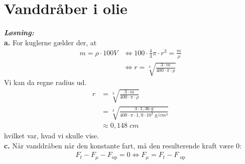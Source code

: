\documentclass{report}
\newcommand{\sol}{\setlength{\parindent}{0cm}\textbf{\textit{Løsning:}}\setlength{\parindent}{1cm}}
\begin{document}
\section*{Vanddråber i olie}
\sol \\
\textbf{a.}
For kuglerne gælder der, at
\begin{equation*}
\begin{split}
  m=\rho \cdot 100 V &\iff 100 \cdot \frac{4}{3} \pi \cdot r^3=\frac{m}{\rho}\\
  &\iff r= \sqrt[3]{\frac{3 \cdot m}{400 \cdot \pi \cdot \rho}} 
\end{split}
\end{equation*}
Vi kan da regne radius ud.
\begin{equation*}
\begin{split}
  r&= \sqrt[3]{\frac{3 \cdot m}{400 \cdot \pi \cdot \rho}} \\
  &= \sqrt[3]{\frac{3 \cdot 1,36 \;\unit{g}  }{400 \cdot \pi \cdot 1,0 \cdot 10^3 \;\unit{g/cm^3}}} \\
  &\approx 0,148 \;\unit{cm} 
\end{split}
\end{equation*}
hvilket var, hvad vi skulle vise.\\[1ex]
\textbf{c.}
Når vanddråben når den konstante fart, må den resulterende kraft være 0:
\begin{equation*}
\begin{split}
  F_t-F_\mu-F_{\text{op} }=0 \iff F_\mu=F_t-F_{\text{ op}}
\end{split}
\end{equation*}
\end{document}
